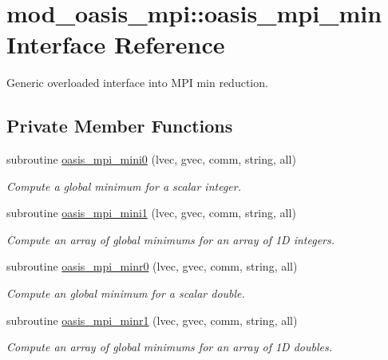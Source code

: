 \hypertarget{interfacemod__oasis__mpi_1_1oasis__mpi__min}{}\section{mod\+\_\+oasis\+\_\+mpi\+:\+:oasis\+\_\+mpi\+\_\+min Interface Reference}
\label{interfacemod__oasis__mpi_1_1oasis__mpi__min}


Generic overloaded interface into M\+PI min reduction.  


\subsection*{Private Member Functions}
\begin{DoxyCompactItemize}
\item 
subroutine \hyperlink{interfacemod__oasis__mpi_1_1oasis__mpi__min_a1deee0fc506aeabafcf4a33866694934}{oasis\+\_\+mpi\+\_\+mini0} (lvec, gvec, comm, string, all)
\begin{DoxyCompactList}\small\item\em Compute a global minimum for a scalar integer. \end{DoxyCompactList}\item 
subroutine \hyperlink{interfacemod__oasis__mpi_1_1oasis__mpi__min_a7f514ac7a5701f4a5ce8612d2e8bcb16}{oasis\+\_\+mpi\+\_\+mini1} (lvec, gvec, comm, string, all)
\begin{DoxyCompactList}\small\item\em Compute an array of global minimums for an array of 1D integers. \end{DoxyCompactList}\item 
subroutine \hyperlink{interfacemod__oasis__mpi_1_1oasis__mpi__min_a18098e0abd7924b31d64e06c789aa0c4}{oasis\+\_\+mpi\+\_\+minr0} (lvec, gvec, comm, string, all)
\begin{DoxyCompactList}\small\item\em Compute an global minimum for a scalar double. \end{DoxyCompactList}\item 
subroutine \hyperlink{interfacemod__oasis__mpi_1_1oasis__mpi__min_a62604730fbe7bf0dc21cf9fb9d83e981}{oasis\+\_\+mpi\+\_\+minr1} (lvec, gvec, comm, string, all)
\begin{DoxyCompactList}\small\item\em Compute an array of global minimums for an array of 1D doubles. \end{DoxyCompactList}\end{DoxyCompactItemize}


